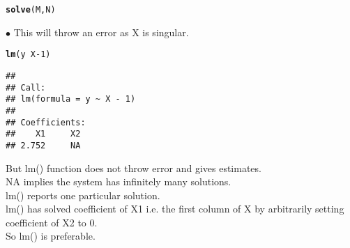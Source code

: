 \documentclass[11pt, a4paper]{article}\usepackage[]{graphicx}\usepackage[]{xcolor}
\makeatletter
\newcommand{\hlnum}[1]{\textcolor[rgb]{0.686,0.059,0.569}{#1}}%
\newcommand{\hlopt}[1]{\textcolor[rgb]{0,0,0}{#1}}%
\newcommand{\hlstd}[1]{\textcolor[rgb]{0.345,0.345,0.345}{#1}}%
\newcommand{\hlkwd}[1]{\textcolor[rgb]{0.737,0.353,0.396}{\textbf{#1}}}%
\newenvironment{kframe}{%
 \def\at@end@of@kframe{}%
 \ifinner\ifhmode%
  \def\at@end@of@kframe{\end{minipage}}%
  \begin{minipage}{\columnwidth}%
 \fi\fi%
 \def\FrameCommand##1{\hskip\@totalleftmargin \hskip-\fboxsep
 \colorbox{shadecolor}{##1}\hskip-\fboxsep
     \hskip-\linewidth \hskip-\@totalleftmargin \hskip\columnwidth}%
 \MakeFramed {\advance\hsize-\width
   \@totalleftmargin\z@ \linewidth\hsize
   \@setminipage}}%
 {\par\unskip\endMakeFramed%
 \at@end@of@kframe}
\newenvironment{knitrout}{}{} %
\makeatother
\begin{document}
\begin{knitrout}
\color{fgcolor}\begin{kframe}
\begin{alltt}
\hlkwd{solve}\hlstd{(M, N)}
\end{alltt}


{\ttfamily\noindent\bfseries\color{errorcolor}{\#\# Error in solve.default(M, N): Lapack routine dgesv: system is exactly singular: U[2,2] = 0}}\end{kframe}
\end{knitrout}

$\bullet$ This will throw an error as X is singular.

\begin{knitrout}
\color{fgcolor}\begin{kframe}
\begin{alltt}
\hlkwd{lm}\hlstd{(y} \hlopt{~} \hlstd{X}\hlopt{-}\hlnum{1}\hlstd{)}
\end{alltt}
\begin{verbatim}
## 
## Call:
## lm(formula = y ~ X - 1)
## 
## Coefficients:
##    X1     X2  
## 2.752     NA
\end{verbatim}
\end{kframe}
\end{knitrout}

But lm() function does not throw error and gives estimates. \\

NA implies the system has infinitely many solutions. \\

lm() reports one particular solution. \\

lm() has solved coefficient of X1 i.e. the first column of X by arbitrarily setting coefficient of X2 to 0. \\

So lm() is preferable.
\end{document}

